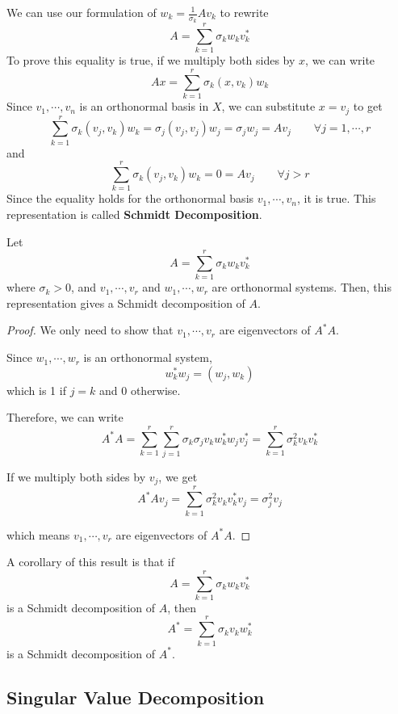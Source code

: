 \begin{definition}
We can use our formulation of $w_{k} = \frac{1}{\sigma_{k}} Av_{k}$ to rewrite 
$$A = \sum_{k = 1}^{r} \sigma_{k} w_{k} v_{k}^{*}$$
To prove this equality is true, if we multiply both sides by $x$, we can write 
$$Ax = \sum_{k = 1}^{r} \sigma_{k} (x, v_{k}) w_{k}$$
Since $v_{1}, \cdots, v_{n}$ is an orthonormal basis in $X$, we can substitute $x = v_{j}$ to get 
$$\sum_{k = 1}^{r} \sigma_{k} (v_{j}, v_{k}) w_{k} = \sigma_{j} (v_{j}, v_{j}) w_{j} = \sigma_{j} w_{j} = Av_{j} \qquad \forall j = 1, \cdots, r$$
and 
$$\sum_{k = 1}^{r} \sigma_{k} (v_{j}, v_{k}) w_{k} = 0 = Av_{j} \qquad \forall j > r$$
Since the equality holds for the orthonormal basis $v_{1}, \cdots, v_{n}$, it is true. This representation is called \textbf{Schmidt Decomposition}.
\end{definition}

\begin{theorem}
Let
$$A = \sum_{k=1}^{r} \sigma_{k} w_{k} v_{k}^{*}$$
where $\sigma_{k} > 0$, and $v_{1}, \cdots, v_{r}$ and $w_{1}, \cdots, w_{r}$ are orthonormal systems. Then, this representation gives a Schmidt decomposition of $A$. 
\end{theorem}

\begin{proof}
We only need to show that $v_{1}, \cdots, v_{r}$ are eigenvectors of $A^{*}A$. 

Since $w_{1}, \cdots, w_{r}$ is an orthonormal system, 
$$w_{k}^{*} w_{j} = (w_{j}, w_{k})$$ 
which is 1 if $j = k$ and 0 otherwise. 

Therefore, we can write 
$$A^{*} A = \sum_{k=1}^{r} \sum_{j=1}^{r} \sigma_{k} \sigma_{j}    v_{k} w_{k}^{*} w_{j} v_{j}^{*} = \sum_{k=1}^{r} \sigma_{k}^{2} v_{k} v_{k}^{*}$$

If we multiply both sides by $v_{j}$, we get 
$$A^{*} A v_{j} = \sum_{k=1}^{r} \sigma_{k}^{2} v_{k} v_{k}^{*}v_{j} = \sigma_{j}^{2} v_{j}$$

which means $v_{1}, \cdots, v_{r}$ are eigenvectors of $A^{*} A$. 
\end{proof}

A corollary of this result is that if 
$$A = \sum_{k=1}^{r} \sigma_{k} w_{k} v_{k}^{*}$$
is a Schmidt decomposition of $A$, then 
$$A^{*} = \sum_{k=1}^{r} \sigma_{k} v_{k} w_{k}^{*}$$
is a Schmidt decomposition of $A^{*}$. 

\subsection{Singular Value Decomposition}

